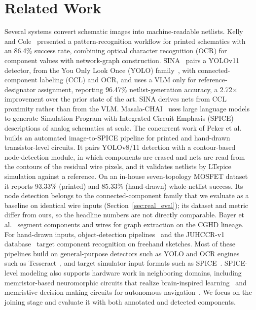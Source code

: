 \documentclass[journal]{IEEEtran}
\begin{document}
\section{Related Work}
\label{sec:related}

Several systems convert schematic images into machine-readable netlists. Kelly and Cole~\cite{kelly2024digitizing} presented a pattern-recognition workflow for printed schematics with an 86.4\% success rate, combining optical character recognition (OCR) for component values with network-graph construction. SINA~\cite{sina2026} pairs a YOLOv11 detector, from the You Only Look Once (YOLO) family~\cite{redmon2016yolo,jocher2023yolo}, with connected-component labeling (CCL) and OCR, and uses a VLM only for reference-designator assignment, reporting 96.47\% netlist-generation accuracy, a 2.72$\times$ improvement over the prior state of the art. SINA derives nets from CCL proximity rather than from the VLM. Masala-CHAI~\cite{masalachai2024} uses large language models to generate Simulation Program with Integrated Circuit Emphasis (SPICE) descriptions of analog schematics at scale. The concurrent work of Peker et al.~\cite{peker2026} builds an automated image-to-SPICE pipeline for printed and hand-drawn transistor-level circuits. It pairs YOLOv8/11 detection with a contour-based node-detection module, in which components are erased and nets are read from the contours of the residual wire pixels, and it validates netlists by LTspice simulation against a reference. On an in-house seven-topology MOSFET dataset it reports 93.33\% (printed) and 85.33\% (hand-drawn) whole-netlist success. Its node detection belongs to the connected-component family that we evaluate as a baseline on identical wire inputs (Section~\ref{sec:real_eval}); its dataset and metric differ from ours, so the headline numbers are not directly comparable. Bayer et al.~\cite{instanceseg2023} segment components and wires for graph extraction on the CGHD lineage. For hand-drawn inputs, object-detection pipelines~\cite{handdrawn2021} and the JUHCCR-v1 database~\cite{juhccr2025} target component recognition on freehand sketches. Most of these pipelines build on general-purpose detectors such as YOLO and OCR engines such as Tesseract~\cite{smith2007tesseract}, and target simulator input formats such as SPICE~\cite{nagel1973spice}. SPICE-level modeling also supports hardware work in neighboring domains, including memristor-based neuromorphic circuits that realize brain-inspired learning~\cite{gao2026memristor} and memristive decision-making circuits for autonomous navigation~\cite{gao2026memristive}. We focus on the joining stage and evaluate it with both annotated and detected components.
\end{document}
